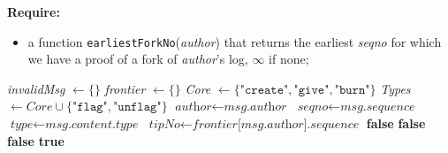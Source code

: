 \documentclass[sigplan,screen,10pt]{acmart}
\begin{document}
\begin{algorithm}
\begin{algorithmic}[1]
  \Statex \textbf{Require:} 
  \begin{itemize}
    \item a function \texttt{earliestForkNo}(\textit{author}) that returns the earliest \textit{seqno} for which we have a proof of a fork of \textit{author}'s log, $\infty$ if none; 
  \end{itemize}
  \State 
  \State \textit{invalidMsg} $\leftarrow \{ \}$ 
  \State \textit{frontier} $\leftarrow \{ \}$  
  \State {}
  \State \textit{Core} $\leftarrow \{ \texttt{"create"}, \texttt{"give"}, \texttt{"burn"} \}$
  \State \textit{Types} $\leftarrow Core \cup \{ \texttt{"flag"}, \texttt{"unflag"} \}$
  \State
      \State $\textit{author} \leftarrow \textit{msg.author}$
      \State $\textit{seqno} \leftarrow \textit{msg.sequence}$
       \State $\textit{type} \leftarrow \textit{msg.content.type}$  
       \State $\textit{tipNo} \leftarrow \textit{frontier}\textit{[msg.author].sequence}$
       \State
        \Return \textbf{false}
       \Return \textbf{false}
         \State \Return \textbf{false}
          \State \Return \textbf{true}
      \EndIf


\end{algorithmic}
\end{algorithm}
\end{document}

